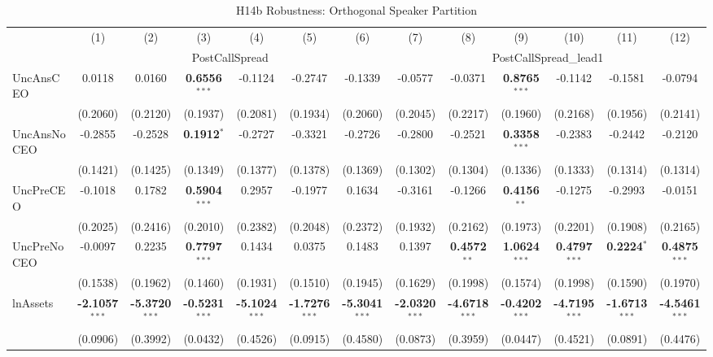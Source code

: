 \documentclass[11pt,a4paper]{article}
\begin{document}
\begin{table}[htbp]
\centering
\caption{H14b Robustness: Orthogonal Speaker Partition}
\label{tab:h14b_robust}
\scriptsize
\begin{tabular}{lcccccccccccc}
\toprule
 & (1) & (2) & (3) & (4) & (5) & (6) & (7) & (8) & (9) & (10) & (11) & (12) \\
 & \multicolumn{6}{c}{PostCallSpread} & \multicolumn{6}{c}{PostCallSpread\_lead1} \\
\cmidrule(lr){2-7} \cmidrule(lr){8-13}
\midrule
UncAnsCEO & 0.0118 & 0.0160 & \textbf{0.6556}$^{***}$ & -0.1124 & -0.2747 & -0.1339 & -0.0577 & -0.0371 & \textbf{0.8765}$^{***}$ & -0.1142 & -0.1581 & -0.0794 \\
 & (0.2060) & (0.2120) & (0.1937) & (0.2081) & (0.1934) & (0.2060) & (0.2045) & (0.2217) & (0.1960) & (0.2168) & (0.1956) & (0.2141) \\
UncAnsNoCEO & -0.2855 & -0.2528 & \textbf{0.1912}$^{*}$ & -0.2727 & -0.3321 & -0.2726 & -0.2800 & -0.2521 & \textbf{0.3358}$^{***}$ & -0.2383 & -0.2442 & -0.2120 \\
 & (0.1421) & (0.1425) & (0.1349) & (0.1377) & (0.1378) & (0.1369) & (0.1302) & (0.1304) & (0.1336) & (0.1333) & (0.1314) & (0.1314) \\
UncPreCEO & -0.1018 & 0.1782 & \textbf{0.5904}$^{***}$ & 0.2957 & -0.1977 & 0.1634 & -0.3161 & -0.1266 & \textbf{0.4156}$^{**}$ & -0.1275 & -0.2993 & -0.0151 \\
 & (0.2025) & (0.2416) & (0.2010) & (0.2382) & (0.2048) & (0.2372) & (0.1932) & (0.2162) & (0.1973) & (0.2201) & (0.1908) & (0.2165) \\
UncPreNoCEO & -0.0097 & 0.2235 & \textbf{0.7797}$^{***}$ & 0.1434 & 0.0375 & 0.1483 & 0.1397 & \textbf{0.4572}$^{**}$ & \textbf{1.0624}$^{***}$ & \textbf{0.4797}$^{***}$ & \textbf{0.2224}$^{*}$ & \textbf{0.4875}$^{***}$ \\
 & (0.1538) & (0.1962) & (0.1460) & (0.1931) & (0.1510) & (0.1945) & (0.1629) & (0.1998) & (0.1574) & (0.1998) & (0.1590) & (0.1970) \\
\midrule
lnAssets & \textbf{-2.1057}$^{***}$ & \textbf{-5.3720}$^{***}$ & \textbf{-0.5231}$^{***}$ & \textbf{-5.1024}$^{***}$ & \textbf{-1.7276}$^{***}$ & \textbf{-5.3041}$^{***}$ & \textbf{-2.0320}$^{***}$ & \textbf{-4.6718}$^{***}$ & \textbf{-0.4202}$^{***}$ & \textbf{-4.7195}$^{***}$ & \textbf{-1.6713}$^{***}$ & \textbf{-4.5461}$^{***}$ \\
 & (0.0906) & (0.3992) & (0.0432) & (0.4526) & (0.0915) & (0.4580) & (0.0873) & (0.3959) & (0.0447) & (0.4521) & (0.0891) & (0.4476) \\

\end{tabular}
\end{table}
\end{document}
